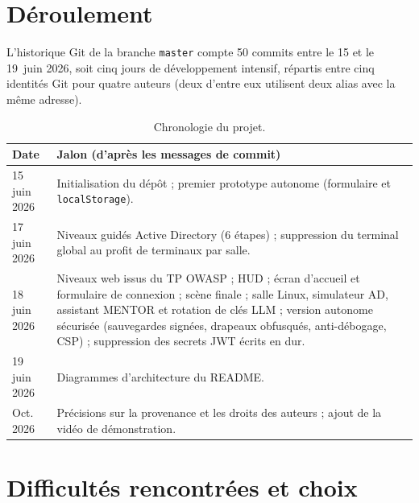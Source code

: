 \documentclass[11pt,a4paper]{report}
\newcommand{\code}[1]{\texttt{\nolinkurl{#1}}}
\begin{document}
\section{D\'eroulement}

L'historique Git de la branche \code{master} compte 50 commits entre le 15 et le
19~juin 2026, soit cinq jours de d\'eveloppement intensif, r\'epartis entre cinq
identit\'es Git pour quatre auteurs (deux d'entre eux utilisent deux alias avec la m\^eme
adresse).

\begin{table}[H]
\centering
\small
\begin{tabularx}{\textwidth}{@{}lX@{}}
\toprule
\textbf{Date} & \textbf{Jalon (d'apr\`es les messages de commit)} \\
\midrule
15 juin 2026 & Initialisation du d\'ep\^ot ; premier prototype autonome (formulaire et \texttt{localStorage}). \\
17 juin 2026 & Niveaux guid\'es Active Directory (6 \'etapes) ; suppression du terminal global au profit de terminaux par salle. \\
18 juin 2026 & Niveaux web issus du TP OWASP ; HUD ; \'ecran d'accueil et formulaire de connexion ; sc\`ene finale ; salle Linux, simulateur AD, assistant MENTOR et rotation de cl\'es LLM ; version autonome s\'ecuris\'ee (sauvegardes sign\'ees, drapeaux obfusqu\'es, anti-d\'ebogage, CSP) ; suppression des secrets JWT \'ecrits en dur. \\
19 juin 2026 & Diagrammes d'architecture du README. \\
Oct. 2026 & Pr\'ecisions sur la provenance et les droits des auteurs ; ajout de la vid\'eo de d\'emonstration. \\
\bottomrule
\end{tabularx}
\caption{Chronologie du projet.}
\end{table}

\section{Difficult\'es rencontr\'ees et choix}
\end{document}
